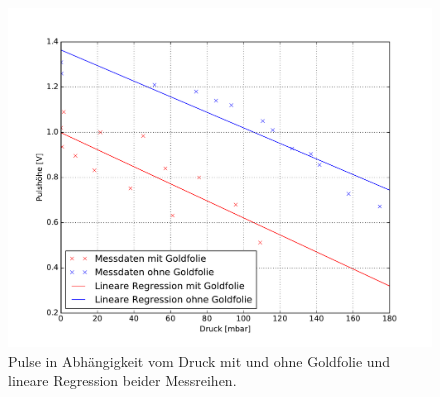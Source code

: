 \begin{figure}[H]
  \centering
  \includegraphics[width=\textwidth]{pulshohe_druck2.pdf}
  \caption{Pulse in Abhängigkeit vom Druck mit und ohne Goldfolie und lineare Regression beider Messreihen.}
  \label{fig:U(p)}
\end{figure}

